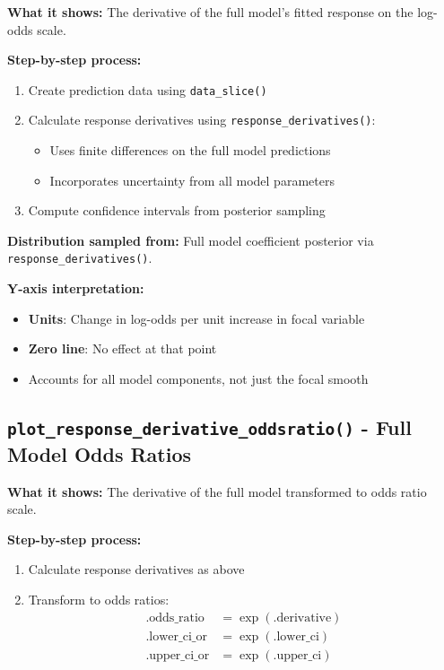 \documentclass[11pt, a4paper]{article}
\begin{document}
\textbf{What it shows:} The derivative of the full model's fitted response on the log-odds scale.

\textbf{Step-by-step process:}
\begin{enumerate}
   \item Create prediction data using \texttt{data\_slice()}
   \item Calculate response derivatives using \texttt{response\_derivatives()}:
   \begin{itemize}
       \item Uses finite differences on the full model predictions
       \item Incorporates uncertainty from all model parameters
   \end{itemize}
   \item Compute confidence intervals from posterior sampling
\end{enumerate}

\textbf{Distribution sampled from:} Full model coefficient posterior via \texttt{response\_derivatives()}.

\textbf{Y-axis interpretation:}
\begin{itemize}
   \item \textbf{Units}: Change in log-odds per unit increase in focal variable
   \item \textbf{Zero line}: No effect at that point
   \item Accounts for all model components, not just the focal smooth
\end{itemize}

\subsection*{\texttt{plot\_response\_derivative\_oddsratio()} - Full Model Odds Ratios}

\textbf{What it shows:} The derivative of the full model transformed to odds ratio scale.

\textbf{Step-by-step process:}
\begin{enumerate}
   \item Calculate response derivatives as above
   \item Transform to odds ratios:
   \begin{align}
   \text{.odds\_ratio} &= \exp(\text{.derivative}) \\
   \text{.lower\_ci\_or} &= \exp(\text{.lower\_ci}) \\
   \text{.upper\_ci\_or} &= \exp(\text{.upper\_ci})
   \end{align}
\end{enumerate}
\end{document}
